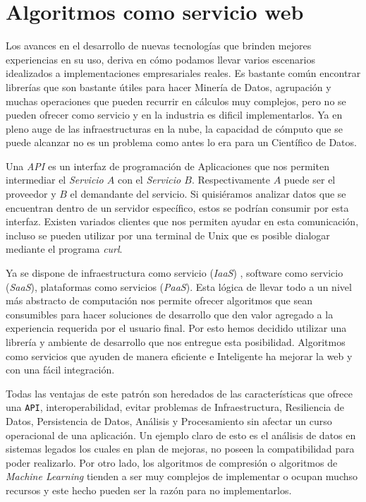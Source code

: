 \section{Algoritmos como servicio web }

	Los avances en el desarrollo de nuevas tecnologías que brinden mejores experiencias en su uso, deriva en cómo podamos llevar varios escenarios idealizados a implementaciones empresariales reales. Es bastante común encontrar librerías que son bastante útiles para hacer Minería de Datos, agrupación y muchas operaciones que pueden recurrir en cálculos muy complejos, pero no se pueden ofrecer como servicio y en la industria es dificil implementarlos. Ya en pleno auge de las infraestructuras en la nube, la capacidad de cómputo que se puede alcanzar no es un problema como antes lo era para un Científico de Datos.


	Una \emph{API} es un interfaz de programación de Aplicaciones que nos permiten intermediar el \emph{Servicio $A$} con el \emph{Servicio $B$}. Respectivamente $A$ puede ser el proveedor y $B$ el demandante del servicio. Si quisiéramos analizar datos que se encuentran dentro de un servidor específico, estos se podrían consumir por esta interfaz. Existen variados clientes que nos permiten ayudar en esta comunicación, incluso se pueden utilizar por una terminal de {Unix} que es posible dialogar mediante el programa \emph{curl}.
	
	Ya se dispone de infraestructura como servicio (\emph{IaaS}) , software como servicio (\emph{SaaS}), plataformas como servicios (\emph{PaaS}). Esta lógica de llevar todo a un nivel más abstracto de computación nos permite ofrecer  algoritmos que sean consumibles para hacer soluciones de desarrollo que den valor agregado a la experiencia requerida por el usuario final. Por esto hemos decidido utilizar una librería y ambiente de desarrollo que nos entregue esta posibilidad. Algoritmos como servicios que ayuden de manera eficiente e Inteligente ha mejorar la web y con una fácil integración. 
	
	Todas las ventajas de este patrón son heredados de las características que ofrece una \texttt{API}, interoperabilidad, evitar problemas de Infraestructura, Resiliencia de Datos, Persistencia de Datos, Análisis y Procesamiento sin afectar un curso operacional de una aplicación. Un ejemplo claro de esto es el análisis de datos en sistemas legados los cuales en plan de mejoras, no poseen la compatibilidad para poder realizarlo. Por otro lado, los algoritmos de compresión o algoritmos de \emph{Machine Learning} tienden a ser muy complejos de implementar o ocupan muchso recursos y este hecho pueden ser la razón para no implementarlos. 
	
	
	
	